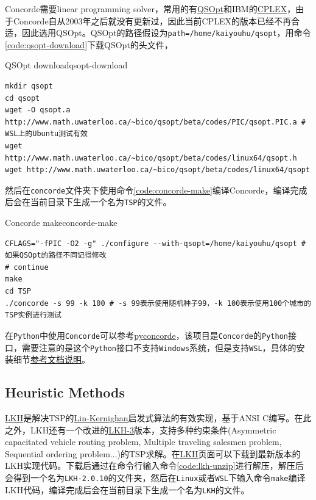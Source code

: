 Concorde需要linear programming solver，常用的有\href{https://www.math.uwaterloo.ca/~bico/qsopt/index.html}{QSOpt}和IBM的\href{https://www.ibm.com/products/ilog-cplex-optimization-studio/cplex-optimizer}{CPLEX}，由于Concorde自从2003年之后就没有更新过，因此当前CPLEX的版本已经不再合适，因此选用QSOpt。QSOpt的路径假设为\texttt{path=/home/kaiyouhu/qsopt}，用命令\ref{code:qsopt-download}下载QSOpt的头文件，

\begin{code}{QSOpt download}{qsopt-download}
\begin{verbatim}
mkdir qsopt
cd qsopt
wget -O qsopt.a http://www.math.uwaterloo.ca/~bico/qsopt/beta/codes/PIC/qsopt.PIC.a # WSL上的Ubuntu测试有效
wget http://www.math.uwaterloo.ca/~bico/qsopt/beta/codes/linux64/qsopt.h
wget http://www.math.uwaterloo.ca/~bico/qsopt/beta/codes/linux64/qsopt
\end{verbatim}
\end{code}

然后在\texttt{concorde}文件夹下使用命令\ref{code:concorde-make}编译Concorde，编译完成后会在当前目录下生成一个名为\texttt{TSP}的文件。

\begin{code}{Concorde make}{concorde-make}
\begin{verbatim}
CFLAGS="-fPIC -O2 -g" ./configure --with-qsopt=/home/kaiyouhu/qsopt # 如果QSOpt的路径不同记得修改
# continue
make
cd TSP
./concorde -s 99 -k 100 # -s 99表示使用随机种子99，-k 100表示使用100个城市的TSP实例进行测试
\end{verbatim}
\end{code}

在\texttt{Python}中使用\texttt{Concorde}可以参考\href{https://github.com/jvkersch/pyconcorde}{pyconcorde}，该项目是\texttt{Concorde}的\texttt{Python}接口，需要注意的是这个\texttt{Python}接口不支持\texttt{Windows}系统，但是支持\texttt{WSL}，具体的安装细节\href{https://github.com/jvkersch/pyconcorde}{参考文档说明}。

\subsection{Heuristic Methods}
\href{http://akira.ruc.dk/~keld/research/LKH/}{LKH}是解决TSP的\href{https://www.wikiwand.com/en/articles/Lin%E2%80%93Kernighan_heuristic}{Lin-Kernighan}启发式算法的有效实现，基于ANSI C编写。在此之外，LKH还有一个改进的\href{http://akira.ruc.dk/~keld/research/LKH-3/}{LKH-3}版本，支持多种约束条件(Asymmetric capacitated vehicle routing problem, Multiple traveling salesmen problem, Sequential ordering problem$\dots$)的TSP求解。在\href{http://akira.ruc.dk/~keld/research/LKH/}{LKH}页面可以下载到最新版本的LKH实现代码。下载后通过在命令行输入命令\ref{code:lkh-unzip}进行解压，解压后会得到一个名为\texttt{LKH-2.0.10}的文件夹，然后在\texttt{Linux}或者\texttt{WSL}下输入命令\texttt{make}编译LKH代码，编译完成后会在当前目录下生成一个名为\texttt{LKH}的文件。

